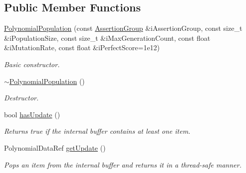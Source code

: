 \subsection*{Public Member Functions}
\begin{DoxyCompactItemize}
\item 
\hypertarget{class_polynomial_population_aabdc5815c2f71683f8946503a91845bc}{\hyperlink{class_polynomial_population_aabdc5815c2f71683f8946503a91845bc}{Polynomial\-Population} (const \hyperlink{class_assertion_group}{Assertion\-Group} \&i\-Assertion\-Group, const size\-\_\-t \&i\-Population\-Size, const size\-\_\-t \&i\-Max\-Generation\-Count, const float \&i\-Mutation\-Rate, const float \&i\-Perfect\-Score=1e12)}\label{class_polynomial_population_aabdc5815c2f71683f8946503a91845bc}

\begin{DoxyCompactList}\small\item\em Basic constructor. \end{DoxyCompactList}\item 
\hypertarget{class_polynomial_population_a02b52e7f55d3c0265baba5c0b8df7c5d}{\hyperlink{class_polynomial_population_a02b52e7f55d3c0265baba5c0b8df7c5d}{$\sim$\-Polynomial\-Population} ()}\label{class_polynomial_population_a02b52e7f55d3c0265baba5c0b8df7c5d}

\begin{DoxyCompactList}\small\item\em Destructor. \end{DoxyCompactList}\item 
\hypertarget{class_polynomial_population_af42a7bf4c36d5adf25a12acc29a1b7b1}{bool \hyperlink{class_polynomial_population_af42a7bf4c36d5adf25a12acc29a1b7b1}{has\-Update} ()}\label{class_polynomial_population_af42a7bf4c36d5adf25a12acc29a1b7b1}

\begin{DoxyCompactList}\small\item\em Returns true if the internal buffer contains at least one item. \end{DoxyCompactList}\item 
\hypertarget{class_polynomial_population_a3a5efce92419c5da88f2199abe8c4c16}{Polynomial\-Data\-Ref \hyperlink{class_polynomial_population_a3a5efce92419c5da88f2199abe8c4c16}{get\-Update} ()}\label{class_polynomial_population_a3a5efce92419c5da88f2199abe8c4c16}

\begin{DoxyCompactList}\small\item\em Pops an item from the internal buffer and returns it in a thread-\/safe manner. \end{DoxyCompactList}\end{DoxyCompactItemize}


